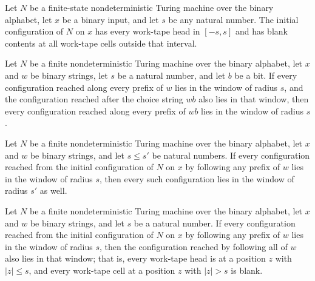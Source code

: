 \begin{lemma}
\label{Complexity.ExpBFS.inWin_init}
\leanok
{}
Let $N$ be a finite-state nondeterministic Turing machine over the binary alphabet, let
$x$ be a binary input, and let $s$ be any natural number. The initial configuration of
$N$ on $x$ has every work-tape head in $[-s,s]$ and has blank contents at all work-tape
cells outside that interval.
\end{lemma}

\begin{lemma}
\label{Complexity.ExpBFS.WinRun.snoc}
\leanok
{}
Let $N$ be a finite nondeterministic Turing machine over the binary alphabet, let $x$
and $w$ be binary strings, let $s$ be a natural number, and let $b$ be a bit. If every
configuration reached along every prefix of $w$ lies in the window of radius $s$, and
the configuration reached after the choice string $wb$ also lies in that window, then
every configuration reached along every prefix of $wb$ lies in the window of radius $s$.
\end{lemma}

\begin{lemma}
\label{Complexity.ExpBFS.WinRun.mono}
\leanok
{}
Let $N$ be a finite nondeterministic Turing machine over the binary alphabet, let $x$
and $w$ be binary strings, and let $s\le s'$ be natural numbers. If every configuration
reached from the initial configuration of $N$ on $x$ by following any prefix of $w$ lies
in the window of radius $s$, then every such configuration lies in the window of radius
$s'$ as well.
\end{lemma}

\begin{lemma}
\label{Complexity.ExpBFS.WinRun.last}
\leanok
{}
Let $N$ be a finite nondeterministic Turing machine over the binary alphabet, let $x$
and $w$ be binary strings, and let $s$ be a natural number. If every configuration
reached from the initial configuration of $N$ on $x$ by following any prefix of $w$ lies
in the window of radius $s$, then the configuration reached by following all of $w$ also
lies in that window; that is, every work-tape head is at a position $z$ with $|z|\le s$,
and every work-tape cell at a position $z$ with $|z|>s$ is blank.
\end{lemma}

